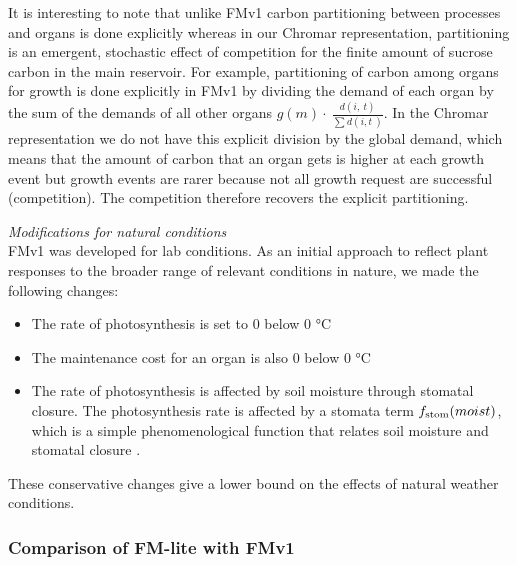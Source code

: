 It is interesting to note that unlike FMv1 carbon partitioning between
processes and organs is done explicitly whereas in our Chromar
representation, partitioning is an emergent, stochastic effect of
competition for the finite amount of sucrose carbon in the main
reservoir. For example, partitioning of carbon among organs for growth
is done explicitly in FMv1 by dividing the demand of each organ by the
sum of the demands of all other organs
\(g( m ) \cdot \ \frac{d(i,\ t)}{\sum_{}^{}{d(i,t\ )}}\). In
the Chromar representation we do not have this explicit division by the
global demand, which means that the amount of carbon that an organ gets
is higher at each growth event but growth events are rarer because not
all growth request are successful (competition). The competition
therefore recovers the explicit partitioning.

\emph{Modifications for natural conditions}\\
FMv1 was developed for lab conditions. As an initial approach to reflect
plant responses to the broader range of relevant conditions in nature,
we made the following changes:

\begin{itemize}
\item
  The rate of photosynthesis is set to 0 below 0 °C
\item
  The maintenance cost for an organ is also 0 below 0 °C
\item
  The rate of photosynthesis is affected by soil moisture through
  stomatal closure. The photosynthesis rate is affected by a stomata
  term \(f_{\mathrm{stom}}(moist)\), which is a simple phenomenological
  function that relates soil moisture and stomatal closure \citep{france_mathematical_1984}.
\end{itemize}

These conservative changes give a lower bound on the effects of natural
weather conditions.

\subsubsection*{Comparison of FM-lite with FMv1}
\label{comparison-of-fm-lite-with-fmv1}

